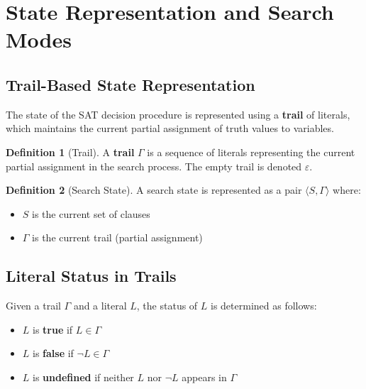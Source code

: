 \documentclass[11pt,a4paper]{article}
\theoremstyle{definition}
\newtheorem{definition}{Definition}[section]
\theoremstyle{plain}
\theoremstyle{remark}
\begin{document}
\section{State Representation and Search Modes}

\subsection{Trail-Based State Representation}

The state of the SAT decision procedure is represented using a \textbf{trail} of literals, which maintains the current partial assignment of truth values to variables.

\begin{tcolorbox}[colback=green!5!white,colframe=green!75!black,title=\textbf{Trail Representation}]
\begin{definition}[Trail]
A \textbf{trail} $\varGamma$ is a sequence of literals representing the current partial assignment in the search process. The empty trail is denoted $\varepsilon$.
\end{definition}

\begin{definition}[Search State]
A search state is represented as a pair $\langle S, \varGamma \rangle$ where:
\begin{itemize}
    \item $S$ is the current set of clauses
    \item $\varGamma$ is the current trail (partial assignment)
\end{itemize}
\end{definition}
\end{tcolorbox}

\subsection{Literal Status in Trails}

Given a trail $\varGamma$ and a literal $L$, the status of $L$ is determined as follows:

\begin{itemize}
    \item $L$ is \textbf{true} if $L \in \varGamma$
    \item $L$ is \textbf{false} if $\neg L \in \varGamma$
    \item $L$ is \textbf{undefined} if neither $L$ nor $\neg L$ appears in $\varGamma$
\end{itemize}
\end{document}
